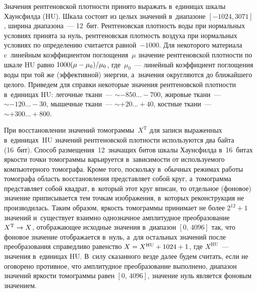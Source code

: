 \begin{multicols}{2}
Значения рентгеновской плотности принято выражать в~единицах шкалы Хаунсфилда (HU). 
Шкала состоит из целых значений в~диапазоне $[-1024, 3071]$, ширина диапазона~--- 
12~бит. Рентгеновская плотность воды при нормальных условиях принята за нуль, 
рентгеновская плотность воздуха при нормальных условиях по определению считается 
равной~$-1000$. Для некоторого материала c~линейным коэффициентом поглощения~$\mu$ 
значение рентгеновской плотности по шкале HU равно $1000(\mu\hm-\mu_0)/\mu_0$, 
где~$\mu_0$~--- линейный коэффициент поглощения воды при той же (эффективной) 
энергии, а~значения округляются до ближайшего целого. Приведем для справки 
некоторые значения рентгеновской плотности в~единицах HU: легочные ткани~---  
$\sim-850\ldots-700$, жировые ткани~--- $\sim-120\ldots-30$, мышечные ткани~--- 
$\sim+20\ldots+40$, костные ткани~--- $\sim+300\ldots+800$.

При восстановлении значений томограммы~$X^{\mathrm{T}}$ 
для записи выраженных в~единицах~HU значений рентгеновской плотности используются 
два байта (16~бит). Способ размещения~12~значащих битов шкалы Хаунсфилда в~16~битах 
яр\-кости точки томограммы варьируется в~зависимости от используемого компьютерного 
томографа. Кроме того, поскольку в~обычных режимах работы томографа область 
восстановления представляет собой круг, а~томограмма представляет собой 
квадрат, в~который этот круг вписан, то отдельное (фоновое) значение приписывается 
тем точкам изображения, в~которых реконструкция не производилась. Таким образом, 
яркость томограммы принимает не более $2^{12}+1$ значений и~существует взаимно 
однозначное амплитудное преобразование  $X^{\mathrm{T}}\hm\to X$, отоб\-ра\-жа\-ющее 
исходные значения в~диапазон $[0,\,4096]$ так, что фоновое значение отоб\-ра\-жа\-ет\-ся 
в~нуль, а~для остальных значений после преобразования справедливо равенство
 $X\hm=X^{\mathrm{HU}}\hm+1024\hm+1$, где $X^{\mathrm{HU}}$~--- 
 значения в~единицах HU. В~силу сказанного везде далее будем считать, если не 
 оговорено противное, что амплитудное преобразование выполнено, диапазон 
 значений яркости томограммы равен $[0,\,4096]$, значение нуль является 
 фоновым значением.
 
 \pagebreak
 
 \begin{figure*} %
\vspace*{1pt}
\begin{center}
\mbox{%
\epsfxsize=148.291mm
}
\end{center}
\vspace*{-9pt}
        \label{fig1}
        \end{figure*}
        

\end{multicols}
